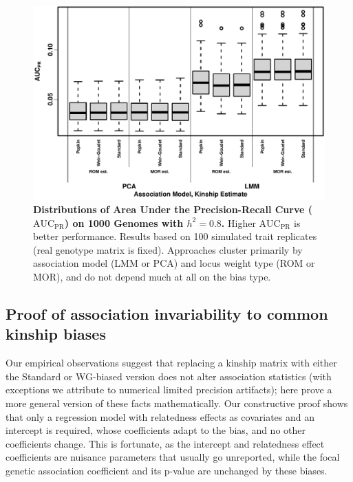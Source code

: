 \documentclass[11pt]{article}
\newcommand{\auc}{\text{AUC}_\text{PR}}
\begin{document}
\begin{linenumbers}
\begin{figure}[bp!]
  \centering
  \includegraphics[width=\textwidth]{tgp-nygc-autosomes_ld_prune_1000kb_0.3_maf-0.01/auc.pdf}
  \caption{
    {\bf Distributions of Area Under the Precision-Recall Curve ($\auc$) on 1000 Genomes with $h^2=0.8$.}
    Higher $\auc$ is better performance.
    Results based on 100 simulated trait replicates (real genotype matrix is fixed).
    Approaches cluster primarily by association model (LMM or PCA) and locus weight type (ROM or MOR), and do not depend much at all on the bias type.
  }
  \label{fig:auc_real}
\end{figure}

\subsection{Proof of association invariability to common kinship biases}

Our empirical observations suggest that replacing a kinship matrix with either the Standard or WG-biased version does not alter association statistics (with exceptions we attribute to numerical limited precision artifacts); here prove a more general version of these facts mathematically.
Our constructive proof shows that only a regression model with relatedness effects as covariates and an intercept is required, whose coefficients adapt to the bias, and no other coefficients change.
This is fortunate, as the intercept and relatedness effect coefficients are nuisance parameters that usually go unreported, while the focal genetic association coefficient and its p-value are unchanged by these biases.


\end{linenumbers}
\end{document}
